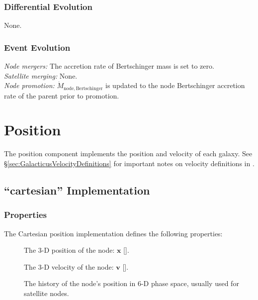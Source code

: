 \subsubsection{Differential Evolution}

None.

\subsubsection{Event Evolution}

\noindent\emph{Node mergers:} The accretion rate of Bertschinger mass is set to zero.\\

\noindent\emph{Satellite merging:} None.\\

\noindent\emph{Node promotion:} $\dot{M}_\mathrm{node, Bertschinger}$ is updated to the \gls{node} Bertschinger accretion rate of the parent prior to promotion.\\

\section{Position}\label{sec:ComponentPosition}

The position \gls{component} implements the position and velocity of each galaxy. See \S\ref{sec:GalacticusVelocityDefinitions} for important notes on velocity definitions in \glc.

\subsection{``cartesian'' Implementation}

\subsubsection{Properties}

The Cartesian position implementation defines the following properties:
\begin{description}
 \item [] The 3-D position of the node: $\mathbf{x}$ [].
 \item [] The 3-D velocity of the node: $\mathbf{v}$ [].
 \item [] The history of the node's position in 6-D phase space, usually used for satellite nodes.
\end{description}

